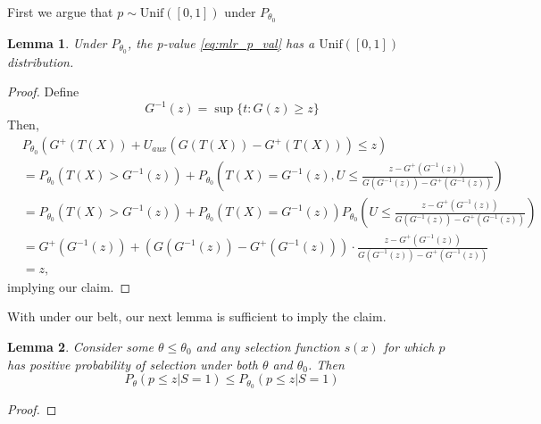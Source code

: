 \documentclass{article}
\newtheorem{lemma}{Lemma}
\begin{document}
\begin{appendix}
First we argue that $p \sim \text{Unif}([0, 1])$ under $P_{\theta_0}$

\begin{lemma}
    \label{lem:uniform}
    Under $P_{\theta_0}$, the p-value \eqref{eq:mlr_p_val} has a $\text{Unif}([0, 1])$ distribution.
\end{lemma}

\begin{proof}
    
Define
\begin{equation*}
    G^{-1}(z) = \sup \{ t : G(z) \geq z\}
\end{equation*}
Then, 
\begin{align*}
        &P_{\theta_0}(G^+(T(X)) + U_{aux}(G(T(X)) - G^+(T(X))) \leq z)\\
        &= P_{\theta_0}(T(X) > G^{-1}(z)) + P_{\theta_0}\left(T(X) = G^{-1}(z),  U \leq \frac{z - G^+(G^{-1}(z))}{G(G^{-1}(z)) - G^{+}(G^{-1}(z))}\right)\\
        &= P_{\theta_0}(T(X) > G^{-1}(z)) + P_{\theta_0}(T(X) = G^{-1}(z)) P_{\theta_0}\left(U \leq \frac{z - G^+(G^{-1}(z))}{G(G^{-1}(z)) - G^{+}(G^{-1}(z))}\right)\\
        &=G^+(G^{-1}(z)) + (G(G^{-1}(z)) - G^{+}(G^{-1}(z))) \cdot \frac{z - G^+(G^{-1}(z))}{G(G^{-1}(z)) - G^{+}(G^{-1}(z))}\\
        &= z,
    \end{align*}
implying our claim. 

\end{proof}

With  under our belt, our next lemma is sufficient to imply the claim.

\begin{lemma}
    \label{lem:mlr}
    Consider some $\theta \leq \theta_0$ and any selection function $s(x)$ for which $p$ has positive probability of selection under both $\theta$ and $\theta_0$. Then 
    \begin{equation*}
        P_{\theta}(p \leq z | S = 1)  \leq P_{\theta_0}(p \leq z | S = 1)
    \end{equation*}
\end{lemma}

\begin{proof}


\end{proof}
\end{appendix}
\end{document}
